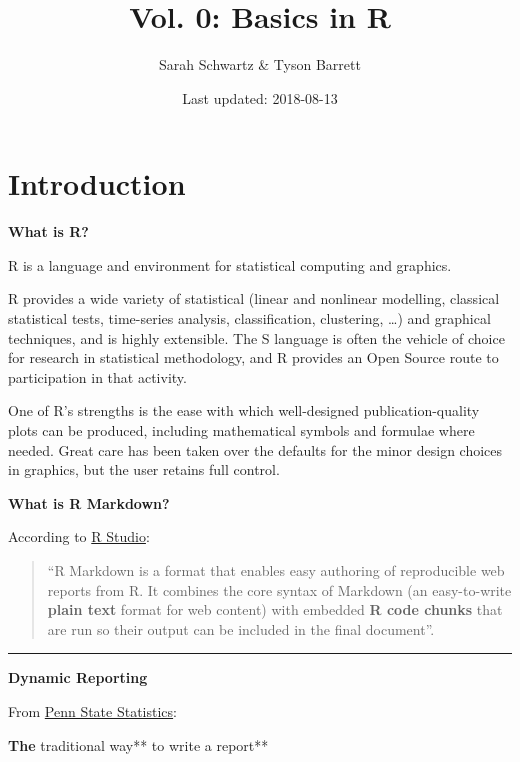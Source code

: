 \documentclass[]{book}
\title{Vol. 0: Basics in R}
\author{Sarah Schwartz \& Tyson Barrett}
\date{Last updated: 2018-08-13}
\begin{document}
\maketitle

{
\setcounter{tocdepth}{1}
\tableofcontents
}
\chapter{Introduction}\label{introduction}

\textbf{What is R?}

R is a language and environment for statistical computing and graphics.
\citep{R-base}

R provides a wide variety of statistical (linear and nonlinear
modelling, classical statistical tests, time-series analysis,
classification, clustering, \ldots{}) and graphical techniques, and is
highly extensible. The S language is often the vehicle of choice for
research in statistical methodology, and R provides an Open Source route
to participation in that activity.

One of R's strengths is the ease with which well-designed
publication-quality plots can be produced, including mathematical
symbols and formulae where needed. Great care has been taken over the
defaults for the minor design choices in graphics, but the user retains
full control.

\textbf{What is R Markdown?}

According to \href{www.rstudio.com}{R Studio}:

\begin{quote}
``R Markdown is a format that enables easy authoring of reproducible web
reports from R. It combines the core syntax of Markdown (an
easy-to-write \textbf{plain text} format for web content) with embedded
\textbf{R code chunks} that are run so their output can be included in
the final document''.
\end{quote}

\begin{center}\rule{0.5\linewidth}{\linethickness}\end{center}

\textbf{Dynamic Reporting}

From
\href{https://onlinecourses.science.psu.edu/statprogram/markdown}{Penn
State Statistics}:

\textbf{The }traditional way** to write a report**
\end{document}
